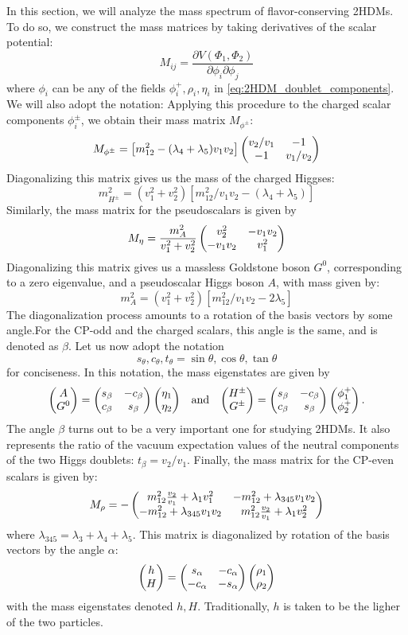In this section, we will analyze the mass spectrum of flavor-conserving 2HDMs. To do so, we construct the mass matrices by taking derivatives of the scalar potential:
\[M_{ij} = \frac{\partial V(\Phi_1,\Phi_2)}{\partial\phi_i\partial\phi_j}\]
where $\phi_{i}$ can be any of the fields $\phi_i^+,\rho_i,\eta_i$ in \eqref{eq:2HDM_doublet_components}. We will also adopt the notation: 
Applying this procedure to the charged scalar components $\phi_i^\pm$, we obtain their mass matrix $M_{\phi^{\pm}}$:
\[M_{\phi^\pm} = \left[m_{12}^2-(\lambda_4+\lambda_5)v_1v_2\right]\begin{pmatrix} v_2/v_1 & -1 \\ -1 & v_1/v_2\end{pmatrix}\]
Diagonalizing this matrix gives us the mass of the charged Higgses:
\[m_{H^\pm}^2 = (v_1^2+v_2^2)[m_{12}^2/v_1v_2-(\lambda_4+\lambda_5)]\]
Similarly, the mass matrix for the pseudoscalars is given by
\[M_{\eta} = \frac{m_A^2}{v_1^2+v_2^2}\begin{pmatrix} v_2^2 & -v_1v_2 \\ -v_1v_2 & v_1^2\end{pmatrix}\]
Diagonalizing this matrix gives us a massless Goldstone boson $G^0$, corresponding to a zero eigenvalue, and a pseudoscalar Higgs boson $A$, with mass given by:
\[m_A^2 = (v_1^2+v_2^2)[m_{12}^2/v_1v_2-2\lambda_5]\]
The diagonalization process amounts to a rotation of the basis vectors by some angle.For the CP-odd and the charged scalars, this angle is the same, and is denoted as $\beta$. Let us now adopt the notation 
\[s_\theta,c_\theta,t_\theta = \sin\theta,\cos\theta,\tan\theta\]
for conciseness. In this notation, the mass eigenstates are given by
\begin{align}
\begin{pmatrix} A \\ G^0\end{pmatrix} = \begin{pmatrix} s_\beta & -c_\beta \\ c_\beta & s_\beta\end{pmatrix}\begin{pmatrix} \eta_1 \\ \eta_2\end{pmatrix}&&\text{and}&&
\begin{pmatrix} H^\pm \\ G^\pm\end{pmatrix} = \begin{pmatrix} s_\beta & -c_\beta \\ c_\beta & s_\beta\end{pmatrix}\begin{pmatrix} \phi_1^+ \\ \phi_2^+\end{pmatrix}.
\end{align}
The angle $\beta$ turns out to be a very important one for studying 2HDMs. It also represents the ratio of the vacuum expectation values of the neutral components of the two Higgs doublets: $t_\beta = v_2/v_1$.
Finally, the mass matrix for the CP-even scalars is given by:
\[M_{\rho} = -\begin{pmatrix} m_{12}^2\frac{v_2}{v_1}+\lambda_1v_1^2 & -m_{12}^2+\lambda_{345}v_1v_2 \\ -m_{12}^2+\lambda_{345}v_1v_2 & m_{12}^2\frac{v_2}{v_1}+\lambda_1v_2^2\end{pmatrix}\]
where $\lambda_{345} = \lambda_3+\lambda_4+\lambda_5$. This matrix is diagonalized by rotation of the basis vectors by the angle $\alpha$:
\[\begin{pmatrix} h \\ H\end{pmatrix} = \begin{pmatrix} s_\alpha & -c_\alpha \\ -c_\alpha & -s_\alpha\end{pmatrix}\begin{pmatrix} \rho_1 \\ \rho_2\end{pmatrix}\]
with the mass eigenstates denoted $h,H$. Traditionally, $h$ is taken to be the ligher of the two particles. 

